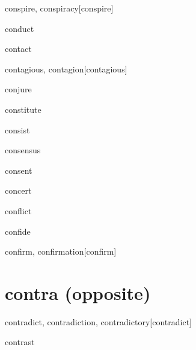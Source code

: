 \begin{RefWord}{conspire, conspiracy}[conspire]
\end{RefWord}

\begin{RefWord}{conduct}
\end{RefWord}

\begin{RefWord}{contact}
\end{RefWord}

\begin{RefWord}{contagious, contagion}[contagious]
\end{RefWord}

\begin{RefWord}{conjure}
\end{RefWord}

\begin{RefWord}{constitute}
\end{RefWord}

\begin{RefWord}{consist}
\end{RefWord}

\begin{RefWord}{consensus}
\end{RefWord}

\begin{RefWord}{consent}
\end{RefWord}

\begin{RefWord}{concert}
\end{RefWord}

\begin{RefWord}{conflict}
\end{RefWord}

\begin{RefWord}{confide}
\end{RefWord}

\begin{RefWord}{confirm, confirmation}[confirm]
\end{RefWord}

\section{contra (opposite)}

\begin{RefWord}{contradict, contradiction, contradictory}[contradict]
\end{RefWord}

\begin{RefWord}{contrast}
\end{RefWord}

